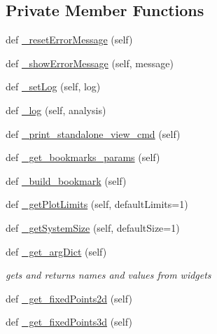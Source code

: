 \subsection*{Private Member Functions}
\begin{DoxyCompactItemize}
\item 
def \hyperlink{class_mu_mo_t_1_1_mu_mo_t_1_1_mu_mo_tview_a6822b561e2f9b618639714cd1545772e}{\+\_\+reset\+Error\+Message} (self)
\item 
def \hyperlink{class_mu_mo_t_1_1_mu_mo_t_1_1_mu_mo_tview_a23d2499d6c6334e35bc4cd7de3dd4d3c}{\+\_\+show\+Error\+Message} (self, message)
\item 
def \hyperlink{class_mu_mo_t_1_1_mu_mo_t_1_1_mu_mo_tview_abfc1e19ed53c088799d1f499bc010f7f}{\+\_\+set\+Log} (self, log)
\item 
def \hyperlink{class_mu_mo_t_1_1_mu_mo_t_1_1_mu_mo_tview_a8b4ffd0e4999bd45c6ca33fe0f40d1e3}{\+\_\+log} (self, analysis)
\item 
def \hyperlink{class_mu_mo_t_1_1_mu_mo_t_1_1_mu_mo_tview_a3af54c33f997937b14f422e772d5280a}{\+\_\+print\+\_\+standalone\+\_\+view\+\_\+cmd} (self)
\item 
def \hyperlink{class_mu_mo_t_1_1_mu_mo_t_1_1_mu_mo_tview_a36fe54d1f3a78f448ecd2a7eef8290d1}{\+\_\+get\+\_\+bookmarks\+\_\+params} (self)
\item 
def \hyperlink{class_mu_mo_t_1_1_mu_mo_t_1_1_mu_mo_tview_a118471f0e7fd4912146ed08084aa4b52}{\+\_\+build\+\_\+bookmark} (self)
\item 
def \hyperlink{class_mu_mo_t_1_1_mu_mo_t_1_1_mu_mo_tview_ab765afe539910b5869f0646dd4a5d915}{\+\_\+get\+Plot\+Limits} (self, default\+Limits=1)
\item 
def \hyperlink{class_mu_mo_t_1_1_mu_mo_t_1_1_mu_mo_tview_abee4df2eb2e49fa8bd5adc2b451b60df}{\+\_\+get\+System\+Size} (self, default\+Size=1)
\item 
def \hyperlink{class_mu_mo_t_1_1_mu_mo_t_1_1_mu_mo_tview_a145c99116673c6b90cc1b2d23e90af93}{\+\_\+get\+\_\+arg\+Dict} (self)
\begin{DoxyCompactList}\small\item\em gets and returns names and values from widgets \end{DoxyCompactList}\item 
def \hyperlink{class_mu_mo_t_1_1_mu_mo_t_1_1_mu_mo_tview_a89e6ad27bf7180f0dce5eb29527e8b73}{\+\_\+get\+\_\+fixed\+Points2d} (self)
\item 
def \hyperlink{class_mu_mo_t_1_1_mu_mo_t_1_1_mu_mo_tview_a52018bf4ba8d3fc732845a0a98b43b26}{\+\_\+get\+\_\+fixed\+Points3d} (self)

\end{DoxyCompactItemize}
